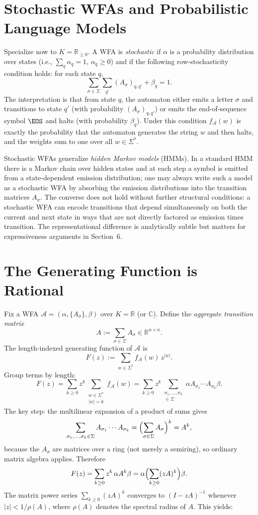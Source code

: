 \section{Stochastic WFAs and Probabilistic Language Models}

Specialize now to $K = \mathbb{R}_{\ge 0}$. A WFA is \emph{stochastic} if $\alpha$ is a probability distribution over states (i.e., $\sum_q \alpha_q = 1$, $\alpha_q \ge 0$) and if the following row-stochasticity condition holds: for each state $q$,
\[
  \sum_{\sigma \in \Sigma} \sum_{q'} (A_\sigma)_{q,q'} + \beta_q = 1.
\]
The interpretation is that from state $q$, the automaton either emits a letter $\sigma$ and transitions to state $q'$ (with probability $(A_\sigma)_{q,q'}$) or emits the end-of-sequence symbol $\EOS$ and halts (with probability $\beta_q$). Under this condition $f_\mathcal{A}(w)$ is exactly the probability that the automaton generates the string $w$ and then halts, and the weights sum to one over all $w \in \Sigma^*$.

Stochastic WFAs generalize \emph{hidden Markov models} (HMMs). In a standard HMM there is a Markov chain over hidden states and at each step a symbol is emitted from a state-dependent emission distribution; one may always write such a model as a stochastic WFA by absorbing the emission distributions into the transition matrices $A_\sigma$. The converse does not hold without further structural conditions: a stochastic WFA can encode transitions that depend simultaneously on both the current and next state in ways that are not directly factored as emission times transition. The representational difference is analytically subtle but matters for expressiveness arguments in Section~6.

\section{The Generating Function is Rational}

Fix a WFA $\mathcal{A} = (\alpha, \{A_\sigma\}, \beta)$ over $K = \mathbb{R}$ (or $\mathbb{C}$). Define the \emph{aggregate transition matrix}
\[
  A := \sum_{\sigma \in \Sigma} A_\sigma \in \mathbb{R}^{n \times n}.
\]
The length-indexed generating function of $\mathcal{A}$ is
\[
  F(z) := \sum_{w \in \Sigma^*} f_\mathcal{A}(w)\, z^{|w|}.
\]
Group terms by length:
\[
  F(z) = \sum_{k \ge 0} z^k \!\!\!\sum_{\substack{w \in \Sigma^* \\ |w| = k}} f_\mathcal{A}(w)
       = \sum_{k \ge 0} z^k \!\!\!\sum_{\substack{\sigma_1,\ldots,\sigma_k \\ \in \Sigma}} \alpha A_{\sigma_1} \cdots A_{\sigma_k} \beta.
\]
The key step: the multilinear expansion of a product of sums gives
\[
  \sum_{\sigma_1,\ldots,\sigma_k \in \Sigma} A_{\sigma_1} \cdots A_{\sigma_k} = \Bigl(\sum_{\sigma \in \Sigma} A_\sigma\Bigr)^k = A^k,
\]
because the $A_\sigma$ are matrices over a ring (not merely a semiring), so ordinary matrix algebra applies. Therefore
\[
  F(z) = \sum_{k \ge 0} z^k\, \alpha A^k \beta = \alpha \Bigl(\sum_{k \ge 0} (zA)^k\Bigr) \beta.
\]
The matrix power series $\sum_{k \ge 0} (zA)^k$ converges to $(I - zA)^{-1}$ whenever $|z| < 1/\rho(A)$, where $\rho(A)$ denotes the spectral radius of $A$. This yields:

